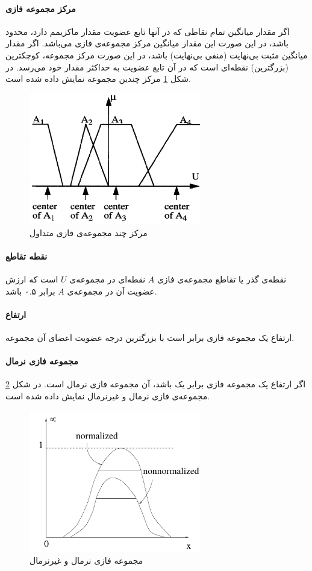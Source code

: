 \documentclass[12pt,a4paper]{article}
\theoremstyle{definition}
\begin{document}
\paragraph{مرکز مجموعه فازی}
اگر مقدار میانگین تمام نقاطی که در آنها تابع عضویت مقدار ماکزیمم دارد، محدود باشد، در این صورت این مقدار میانگین مرکز مجموعه‌ی فازی می‌باشد. اگر مقدار میانگین مثبت بی‌نهایت (منفی بی‌نهایت) باشد، در این صورت مرکز مجموعه، کوچکترین (بزرگترین) نقطه‌ای است که در آن تابع عضویت به حداکثر مقدار خود می‌رسد. در شکل 
\ref{fig:f_5}
مرکز چندین مجموعه نمایش داده شده است.
\begin{figure}[h]
	\centering 
	\includegraphics[width=75mm]{Images/Fig5.png}
	\vspace{-0.5cm}
	\caption{مرکز چند مجموعه‌ی فازی متداول}\label{fig:f_5}
\end{figure}
\paragraph{نقطه تقاطع}
نقطه‌ی گذر یا تقاطع 
مجموعه‌ی فازی $A$ نقطه‌ای در مجموعه‌ی $U$ است که ارزش عضویت آن در مجموعه‌ی $A$ برابر ۰.۵ باشد.
\paragraph{ارتفاع}
ارتفاع یک مجموعه فازی برابر است با بزرگترین درجه عضویت اعضای آن مجموعه.
\paragraph{مجموعه فازی نرمال}
اگر ارتفاع یک مجموعه فازی برابر یک باشد، آن مجموعه فازی نرمال است. در شکل 
\ref{fig:f_6}
مجموعه‌ی فازی نرمال و غیرنرمال نمایش داده شده است.
\begin{figure}[h]
	\centering 
	\includegraphics[width=75mm]{Images/Fig6.png}
		\vspace{-0.5cm}
	\caption{مجموعه فازی نرمال و غیرنرمال}\label{fig:f_6}
\end{figure}
\end{document}
